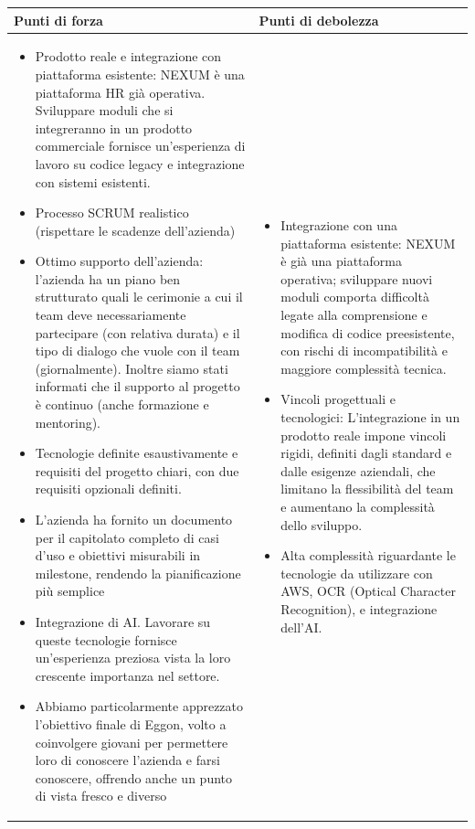 \documentclass[a4paper,11pt]{article}
\begin{document}
{\footnotesize
\begin{tabularx}{\textwidth}{|X|X|}
\hline
\rowcolor{lightgray!40} %
\textbf{Punti di forza} & \textbf{Punti di debolezza} \\
\hline
\begin{itemize}
\item Prodotto reale e integrazione con piattaforma esistente: NEXUM è una piattaforma HR già operativa. Sviluppare moduli che si integreranno in un prodotto commerciale fornisce un'esperienza di lavoro su codice legacy e integrazione con sistemi esistenti.
\item Processo SCRUM realistico (rispettare le scadenze dell'azienda)
\item Ottimo supporto dell'azienda: l'azienda ha un piano ben strutturato quali le cerimonie a cui il team deve necessariamente partecipare (con relativa durata) e il tipo di dialogo che vuole con il team (giornalmente). Inoltre siamo stati informati che il supporto al progetto è continuo (anche formazione e mentoring).
\item Tecnologie definite esaustivamente e  requisiti del progetto chiari, con due requisiti opzionali definiti.
\item L'azienda ha fornito un documento per il capitolato completo di casi d'uso e obiettivi misurabili in milestone, rendendo la pianificazione più semplice
\item Integrazione di AI. Lavorare su queste tecnologie fornisce un'esperienza preziosa vista la loro crescente importanza nel settore.
\item Abbiamo particolarmente apprezzato l'obiettivo finale di Eggon, volto a coinvolgere giovani per permettere loro di conoscere l'azienda e farsi conoscere, offrendo anche un punto di vista fresco e diverso
\end{itemize}
& 
\begin{itemize}
  \item Integrazione con una piattaforma esistente: NEXUM è già una piattaforma operativa; sviluppare nuovi moduli comporta difficoltà legate alla comprensione e modifica di codice preesistente, con rischi di incompatibilità e maggiore complessità tecnica.
    \item Vincoli progettuali e tecnologici: L'integrazione in un prodotto reale impone vincoli rigidi, definiti dagli standard e dalle esigenze aziendali, che limitano la flessibilità del team e aumentano la complessità dello sviluppo.
\item Alta complessità riguardante le tecnologie da utilizzare con AWS, OCR (Optical Character Recognition), e integrazione dell'AI.
\end{itemize} \\
\hline
\end{tabularx}
}
\end{document}
